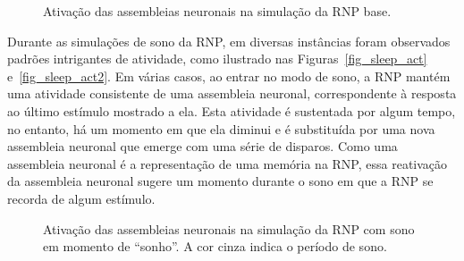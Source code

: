 \begin{figure}[!ht]
\caption{Ativação das assembleias neuronais na simulação da RNP base.}
\end{figure}

Durante as simulações de sono da RNP, em diversas instâncias foram observados padrões intrigantes de atividade, como ilustrado nas
Figuras~\ref{fig_sleep_act} e~\ref{fig_sleep_act2}. Em várias casos, ao entrar no modo de sono, a RNP mantém uma atividade
consistente de uma assembleia neuronal, correspondente à resposta ao último estímulo mostrado a ela. Esta atividade é sustentada
por algum tempo, no entanto, há um momento em que ela diminui e é substituída por uma nova assembleia neuronal que emerge com uma
série de disparos. Como uma assembleia neuronal é a representação de uma memória na RNP, essa reativação da assembleia neuronal
sugere um momento durante o sono em que a RNP se recorda de algum estímulo.

\begin{figure}[!ht]
\caption{Ativação das assembleias neuronais na simulação da RNP com sono em momento de ``sonho''. A cor cinza indica o período de sono.}
\end{figure}

